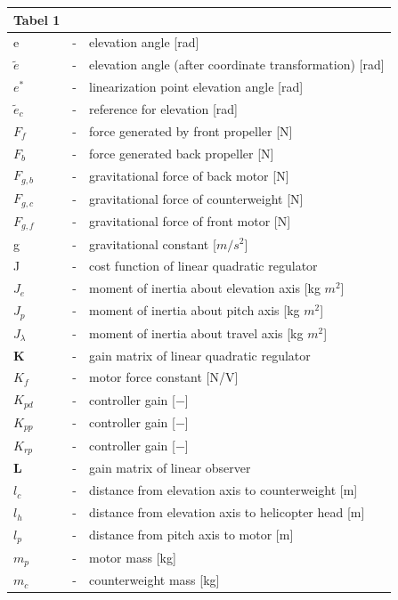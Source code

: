 \begin{center}
\begin{tabular}{ l  c  l }{Tabel 1}\\
  \hline			
    e & - & elevation angle [rad]\\
    $\tilde{e}$ & -& elevation angle (after coordinate transformation) [rad]\\
    $e{}^*$& - & linearization point elevation angle [rad]\\
    $\tilde{e}_c$ & - &reference for elevation [rad]\\
    $F_f$ &- & force generated by front propeller [N]\\
    $F_b$ &- & force generated back propeller [N]\\
    $F_{g,b}$ &- & gravitational force of back motor [N]\\
    $F_{g,c}$ & - & gravitational force of counterweight [N]\\
    $F_{g,f}$ & - & gravitational force of front motor [N]\\
    g & - & gravitational constant [$m/s^2$]\\
    J & - & cost function of linear quadratic regulator\\
    $J_e$ & - & moment of inertia about elevation axis [kg $m^2$]\\
    $J_p$ & - & moment of inertia about pitch axis [kg $m^2$] \\
    $J_\lambda$ & - & moment of inertia about travel axis [kg $m^2$]\\
    \textbf{K} & - & gain matrix of linear quadratic regulator\\
    $K_f$ & - & motor force constant [N/V]\\
    $K_{pd}$ &  - & controller gain [\(-\)] \\
    $K_{pp}$ & - & controller gain [\(-\)] \\
    $K_{rp}$ & - & controller gain [\(-\)] \\
    \textbf{L} & - & gain matrix of linear observer\\
    $l_c$ & - & distance from elevation axis to counterweight [m]\\
    $l_h$ & - & distance from elevation axis to helicopter head [m]\\
    $l_p$ & - & distance from pitch axis to motor [m]\\
    $m_p$ & - & motor mass [kg]\\
    $m_c$ & - & counterweight mass [kg]\\
  \hline  
\end{tabular}
\end{center}


